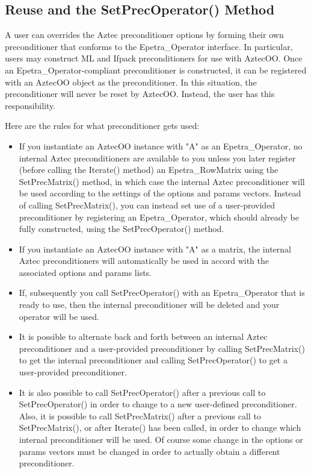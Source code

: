 \documentclass[12pt,relax]{AztecOOUserGuide}
\newcommand{\rowmatrix}{Epetra\_RowMatrix}
\newcommand{\operator}{Epetra\_Operator}
\begin{document}
\subsection{Reuse and the SetPrecOperator() Method}

A user can overrides the Aztec preconditioner options by
forming their own preconditioner that conforms to the \operator{}
interface.  In particular, users may construct ML and Ifpack
preconditioners for use with AztecOO.  Once an \operator{}-compliant
preconditioner is constructed, it can be registered with an AztecOO
object as the preconditioner.  In this situation, the preconditioner
will never be reset by AztecOO.  Instead, the user has this responsibility.

Here are the rules for what preconditioner gets used:
\begin{itemize}
\item If you instantiate an AztecOO instance with "A" as an
\operator{}, no internal Aztec preconditioners are available to you
unless you later register (before calling the Iterate() method) an
\rowmatrix{} using the SetPrecMatrix() method, in which case the
internal Aztec preconditioner will be used according to the settings
of the options and params vectors.  Instead of calling
SetPrecMatrix(), you can instead set use of a user-provided
preconditioner by registering an \operator{}, which should already
be fully constructed, using the SetPrecOperator() method.

\item If you instantiate an AztecOO instance with "A" as a matrix,
the internal Aztec preconditioners will automatically be used in
accord with the associated options and params lists.

\item If, subsequently you call SetPrecOperator() with an
\operator{} that is ready to use, then the internal preconditioner
will be deleted and your operator will be used.

\item It is possible to alternate back and forth between an internal
Aztec preconditioner and a user-provided preconditioner by calling
SetPrecMatrix() to get the internal preconditioner and calling
SetPrecOperator() to get a user-provided preconditioner.

\item It is also possible to call SetPrecOperator() after a previous
call to SetPrecOperator() in order to change to a new user-defined
preconditioner. Also, it is possible to call SetPrecMatrix() after a
previous call to SetPrecMatrix(), or after Iterate() has been
called, in order to change which internal preconditioner will be
used.  Of course some change in the options or params vectors must
be changed in order to actually obtain a different preconditioner.
\end{itemize}
\end{document}
